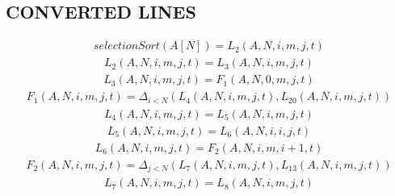 \documentclass{article}
\begin{document}
\subsection{CONVERTED LINES}
\begin{equation*}\begin{split}
selectionSort\left(A[N]\right) = L_{2}\left(A,N,i,m,j,t\right)
\end{split}\end{equation*}
\begin{equation*}\begin{split}
L_{2}\left(A,N,i,m,j,t\right) = L_{3}\left(A,N,i,m,j,t\right)
\end{split}\end{equation*}
\begin{equation*}\begin{split}
L_{3}\left(A,N,i,m,j,t\right) = F_{1}\left(A,N,0,m,j,t\right)
\end{split}\end{equation*}
\begin{equation*}\begin{split}
F_{1}\left(A,N,i,m,j,t\right) = \Delta_{i < N}\left(L_{4}\left(A,N,i,m,j,t\right),L_{20}\left(A,N,i,m,j,t\right)\right)
\end{split}\end{equation*}
\begin{equation*}\begin{split}
L_{4}\left(A,N,i,m,j,t\right) = L_{5}\left(A,N,i,m,j,t\right)
\end{split}\end{equation*}
\begin{equation*}\begin{split}
L_{5}\left(A,N,i,m,j,t\right) = L_{6}\left(A,N,i,i,j,t\right)
\end{split}\end{equation*}
\begin{equation*}\begin{split}
L_{6}\left(A,N,i,m,j,t\right) = F_{2}\left(A,N,i,m,i+1,t\right)
\end{split}\end{equation*}
\begin{equation*}\begin{split}
F_{2}\left(A,N,i,m,j,t\right) = \Delta_{j < N}\left(L_{7}\left(A,N,i,m,j,t\right),L_{13}\left(A,N,i,m,j,t\right)\right)
\end{split}\end{equation*}
\begin{equation*}\begin{split}
L_{7}\left(A,N,i,m,j,t\right) = L_{8}\left(A,N,i,m,j,t\right)
\end{split}\end{equation*}
\end{document}
